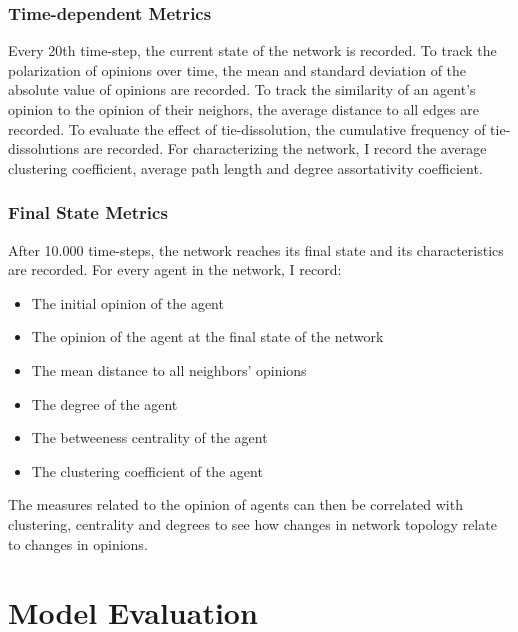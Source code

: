 \documentclass{article}
\begin{document}
\subsubsection{Time-dependent Metrics}
Every 20th time-step, the current state of the network is recorded. 
To track the polarization of opinions over time,
the mean and standard deviation of the absolute value of opinions are recorded.
To track the similarity of an agent's opinion to the opinion of their neighors, the average distance to all edges are recorded.
To evaluate the effect of tie-dissolution, the cumulative frequency of tie-dissolutions are recorded.
For characterizing the network, I record the average clustering coefficient, average path length and degree assortativity coefficient.

\subsubsection{Final State Metrics}
After 10.000 time-steps, the network reaches its final state and its characteristics are recorded. 
For every agent in the network, I record: 
\begin{itemize}
    \item The initial opinion of the agent
    \item The opinion of the agent at the final state of the network
    \item The mean distance to all neighbors' opinions
    \item The degree of the agent 
    \item The betweeness centrality of the agent 
    \item The clustering coefficient of the agent 
\end{itemize}

The measures related to the opinion of agents can then be correlated with clustering, centrality and degrees to see how changes in network topology relate to changes in opinions. 

\section{Model Evaluation}
\end{document}
